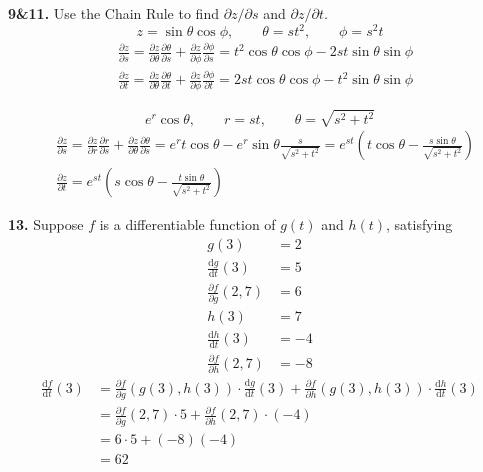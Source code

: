 \documentclass[a4paper,12pt]{article}
\newcommand{\tho}[3][]{\frac{\partial #1 #2}{\partial #3 #1}}
\newcommand{\leibniz}[3][]{\frac{\mathrm{d} #1 #2}{\mathrm{d} #3 #1}}
\newcommand{\exercise}[1]{\noindent\textbf{#1.}}
\begin{document}
\exercise{9\&11} Use the Chain Rule to find $\partial z/\partial s$ and
$\partial z/\partial t$.
\[z = \sin\theta\cos\phi,\qquad \theta = st^2,\qquad \phi = s^2t\tag{9}\]
\begin{align*}
& \tho{z}{s}
= \tho{z}{\theta}\tho{\theta}{s} + \tho{z}{\phi}\tho{\phi}{s}
= t^2\cos\theta\cos\phi - 2st\sin\theta\sin\phi\\
& \tho{z}{t}
= \tho{z}{\theta}\tho{\theta}{t} + \tho{z}{\phi}\tho{\phi}{t}
= 2st\cos\theta\cos\phi - t^2\sin\theta\sin\phi
\end{align*}

\[e^r\cos\theta,\qquad r = st,\qquad \theta = \sqrt{s^2 + t^2}\tag{11}\]
\begin{align*}
& \tho{z}{s}
= \tho{z}{r}\tho{r}{s} + \tho{z}{\theta}\tho{\theta}{s}
= e^rt\cos\theta - e^r\sin\theta\frac{s}{\sqrt{s^2 + t^2}}
= e^{st}\left(t\cos\theta - \frac{s\sin\theta}{\sqrt{s^2 + t^2}}\right)\\
& \tho{z}{t} = e^{st}\left(s\cos\theta - \frac{t\sin\theta}{\sqrt{s^2 + t^2}}\right)
\end{align*}

\exercise{13} Suppose $f$ is a differentiable function of $g(t)$ and $h(t)$,
satisfying
\begin{align*}
  g(3) &= 2\\
  \leibniz{g}{t}(3) &= 5\\
  \tho{f}{g}(2, 7) &= 6\\
  h(3) &= 7\\
  \leibniz{h}{t}(3) &= -4\\
  \tho{f}{h}(2, 7) &= -8
\end{align*}
\begin{align*}
   \leibniz{f}{t}(3)
&= \tho{f}{g}(g(3), h(3))\cdot\leibniz{g}{t}(3)
 + \tho{f}{h}(g(3), h(3))\cdot\leibniz{h}{t}(3)\\
&= \tho{f}{g}(2, 7) \cdot 5
 + \tho{f}{h}(2, 7) \cdot (-4)\\
&= 6 \cdot 5 + (-8)(-4)\\
&= 62
\end{align*}
\end{document}
